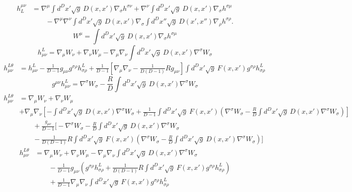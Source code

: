 \documentclass[10pt,letterpaper]{article}
\begin{document}
\begin{align}
  h^{\mu\nu}_L&=\nabla^\mu \int d^Dx' \sqrt{g}\ D(x,x')\nabla_\sigma h^{\sigma\nu} + \nabla^\nu \int d^Dx' \sqrt{g}\  D(x,x')\nabla_\sigma h^{\sigma\mu} 
\\
&\qquad -\nabla^\mu\nabla^\nu \int d^Dx'\sqrt{g}\  D(x,x') \nabla_\sigma \int d^Dx'' \sqrt{g}\ D(x',x'')\nabla_\rho h^{\sigma\rho}.
\end{align}
\begin{equation}
W^{\mu} = \int d^Dx' \sqrt{g}\ D(x,x')\nabla_\sigma h^{\sigma\mu}
\end{equation}
\begin{equation}
h_{\mu\nu}^L = \nabla_\mu W_\nu + \nabla_\nu W_\mu - \nabla_\mu\nabla_\nu \int d^Dx' \sqrt{g}\ D(x,x')\nabla^\sigma W_\sigma
\end{equation}
\begin{align}
h_{\mu\nu}^{L\theta} &= h_{\mu\nu}^L - \frac{1}{D-1} g_{\mu\nu} g^{\sigma\rho}h_{\sigma\rho}^L
+ \frac{1}{D-1}\left[ \nabla_\mu\nabla_\nu - \frac{1}{D(D-1)}Rg_{\mu\nu}\right]\int d^Dx' \sqrt{g}\ F(x,x')g^{\sigma\rho}h_{\sigma\rho}^L
\end{align}
\begin{equation}
g^{\mu\nu}h_{\mu\nu}^{L} = \nabla^\sigma W_\sigma - \frac{R}{D} \int d^Dx' \sqrt{g}\ D(x,x')\nabla^\sigma W_\sigma
\end{equation}
\begin{align}
h_{\mu\nu}^{L\theta} &= \nabla_\mu W_\nu + \nabla_\nu W_\mu 
\nonumber\\
\quad &+ \nabla_\mu\nabla_\nu \left[ - \int d^Dx' \sqrt{g}\ D(x,x')\nabla^\sigma W_\sigma + \frac{1}{D-1} \int d^Dx' \sqrt{g}\ F(x,x') \left( \nabla^\sigma W_\sigma-\frac{R}{D}\int d^Dx' \sqrt{g}\ D(x,x')\nabla^\sigma W_\sigma\right)\right]
\nonumber\\
&\qquad + \frac{g_{\mu\nu}}{D-1}\bigg[ - \nabla^\sigma W_\sigma - \frac{R}{D} \int d^Dx' \sqrt{g}\ D(x,x')\nabla^\sigma W_\sigma 
\nonumber \\
&\qquad
- \frac{1}{D(D-1)}R \int d^Dx' \sqrt{g}\ F(x,x') \left( \nabla^\sigma W_\sigma-\frac{R}{D}\int d^Dx' \sqrt{g}\ D(x,x')\nabla^\sigma W_\sigma\right)\bigg]
\nonumber
\end{align}
\begin{align}
h_{\mu\nu}^{L\theta} &=\nabla_\mu W_\nu + \nabla_\nu W_\mu - \nabla_\mu\nabla_\nu \int d^Dx' \sqrt{g}\ D(x,x')\nabla^\sigma W_\sigma
\nonumber\\
&\qquad - \frac{1}{D-1} g_{\mu\nu} \left( g^{\sigma\rho}h_{\sigma\rho}^L + \frac{1}{D(D-1)}R
\int d^Dx' \sqrt{g}\ F(x,x')g^{\sigma\rho}h_{\sigma\rho}^L\right)
\nonumber\\
&\qquad
+ \frac{1}{D-1}\nabla_\mu\nabla_\nu \int d^Dx' \sqrt{g}\ F(x,x')g^{\sigma\rho}h_{\sigma\rho}^L
\end{align}
\end{document}
